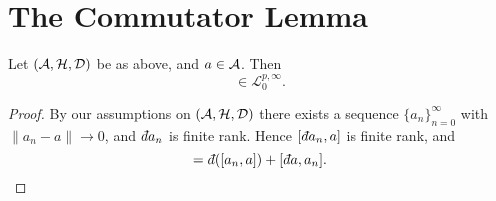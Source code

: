\section{The Commutator Lemma}
\begin{lemma}
    Let $(\mathcal{A},\mathcal{H},\mathcal{D})$ be as above, and $a \in \mathcal{A}$. Then
    \begin{equation*}
        [\qd a,a] \in \mathcal{L}^{p,\infty}_0.
    \end{equation*}
\end{lemma}
\begin{proof}
    By our assumptions on $(\mathcal{A},\mathcal{H},\mathcal{D})$ there exists a sequence $\{a_n\}_{n=0}^\infty$
    with $\|a_n-a\| \rightarrow 0$, and 
    $\qd a_n$ is finite rank. Hence $[\qd a_n,a]$ is finite rank, and
    \begin{equation*}
        [\qd a,a_n] = \qd([a_n,a]) + [\qd a,a_n].
    \end{equation*}
\end{proof}
